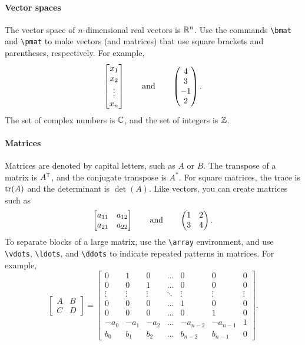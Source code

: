 \paragraph{Vector spaces}

The vector space of $n$-dimensional real vectors is $\mathbb{R}^n$. Use the commands \verb|\bmat| and \verb|\pmat| to make vectors (and matrices) that use square brackets and parentheses, respectively. For example,
\[
  \begin{bmatrix}x_1 \\ x_2 \\ \vdots \\ x_n\end{bmatrix} \qquad\text{and}\qquad \begin{pmatrix}4 \\ 3 \\ -1 \\ 2\end{pmatrix}.
\]
The set of complex numbers is $\mathbb{C}$, and the set of integers is $\mathbb{Z}$.

\paragraph{Matrices}

Matrices are denoted by capital letters, such as $A$ or $B$. The transpose of a matrix is $A^{\mathsf{T}}$, and the conjugate transpose is $A^*$. For square matrices, the trace is $\operatorname{\mathrm{tr}}(A)$ and the determinant is $\det(A)$. Like vectors, you can create matrices such as
\[
  \begin{bmatrix}a_{11} & a_{12} \\ a_{21} & a_{22}\end{bmatrix} \qquad\text{and}\qquad \begin{pmatrix}1 & 2 \\ 3 & 4\end{pmatrix}.
\]
To separate blocks of a large matrix, use the \verb|\array| environment, and use \verb|\vdots|, \verb|\ldots|, and \verb|\ddots| to indicate repeated patterns in matrices. For example,
\[
  \left[\begin{array}{c|c}
  A & B \\ \hline C & D \end{array}\right] = \left[\begin{array}{cccccc|c}
  0 & 1 & 0 & \ldots & 0 & 0 & 0 \\
  0 & 0 & 1 & \ldots & 0 & 0 & 0 \\
  \vdots & \vdots & \vdots & \ddots & \vdots & \vdots & \vdots \\
  0 & 0 & 0 & \ldots & 1 & 0 & 0 \\
  0 & 0 & 0 & \ldots & 0 & 1 & 0 \\
  -a_0 & -a_1 & -a_2 & \ldots & -a_{n-2} & -a_{n-1} & 1 \\ \hline
  b_0 & b_1 & b_2 & \ldots & b_{n-2} & b_{n-1} & 0 \end{array}\right].
\]